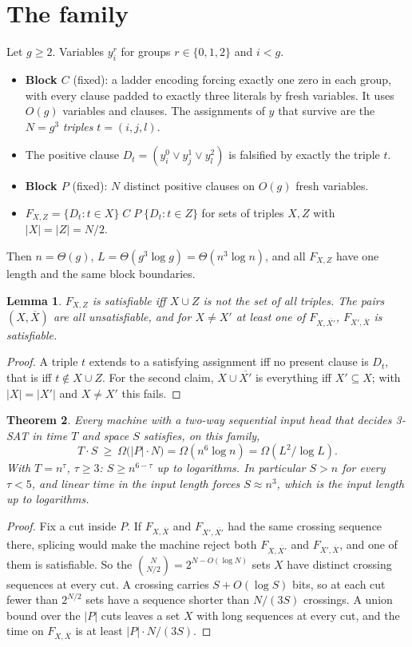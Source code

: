 \documentclass[11pt]{article}
\newtheorem{theorem}{Theorem}
\newtheorem{lemma}[theorem]{Lemma}
\begin{document}
\section{The family}
Let $g\ge2$. Variables $y^{r}_{i}$ for groups $r\in\{0,1,2\}$ and $i<g$.
\begin{itemize}
\item \textbf{Block $C$} (fixed): a ladder encoding forcing exactly one zero in each group, with every clause padded to exactly three literals by fresh variables. It uses $O(g)$ variables and clauses. The assignments of $y$ that survive are the $N=g^{3}$ \emph{triples} $t=(i,j,l)$.
\item The positive clause $D_t=(y^{0}_{i}\vee y^{1}_{j}\vee y^{2}_{l})$ is falsified by exactly the triple $t$.
\item \textbf{Block $P$} (fixed): $N$ distinct positive clauses on $O(g)$ fresh variables.
\item $F_{X,Z}=\{D_t:t\in X\}\;C\;P\;\{D_t:t\in Z\}$ for sets of triples $X,Z$ with $|X|=|Z|=N/2$.
\end{itemize}
Then $n=\Theta(g)$, $L=\Theta(g^{3}\log g)=\Theta(n^{3}\log n)$, and all $F_{X,Z}$ have one length and the same block boundaries.

\begin{lemma}\label{lem:fam}
$F_{X,Z}$ is satisfiable iff $X\cup Z$ is not the set of all triples. The pairs $(X,\overline X)$ are all unsatisfiable, and for $X\ne X'$ at least one of $F_{X,\overline{X'}}$, $F_{X',\overline X}$ is satisfiable.
\end{lemma}
\begin{proof}
A triple $t$ extends to a satisfying assignment iff no present clause is $D_t$, that is iff $t\notin X\cup Z$. For the second claim, $X\cup\overline{X'}$ is everything iff $X'\subseteq X$; with $|X|=|X'|$ and $X\ne X'$ this fails.
\end{proof}

\begin{theorem}\label{thm:ts}
Every machine with a two-way sequential input head that decides 3-SAT in time $T$ and space $S$ satisfies, on this family,
\[T\cdot S\ \ge\ \Omega\bigl(|P|\cdot N\bigr)=\Omega(n^{6}\log n)=\Omega(L^{2}/\log L).\]
With $T=n^{\tau}$, $\tau\ge3$: $S\ge n^{6-\tau}$ up to logarithms. In particular $S>n$ for every $\tau<5$, and linear time in the input length forces $S\approx n^{3}$, which is the input length up to logarithms.
\end{theorem}
\begin{proof}
Fix a cut inside $P$. If $F_{X,\overline X}$ and $F_{X',\overline{X'}}$ had the same crossing sequence there, splicing would make the machine reject both $F_{X,\overline{X'}}$ and $F_{X',\overline X}$, and one of them is satisfiable. So the $\binom N{N/2}=2^{N-O(\log N)}$ sets $X$ have distinct crossing sequences at every cut. A crossing carries $S+O(\log S)$ bits, so at each cut fewer than $2^{N/2}$ sets have a sequence shorter than $N/(3S)$ crossings. A union bound over the $|P|$ cuts leaves a set $X$ with long sequences at every cut, and the time on $F_{X,\overline X}$ is at least $|P|\cdot N/(3S)$.
\end{proof}
\end{document}
